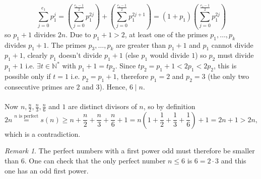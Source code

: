 \documentclass[11pt, a4paper, oneside]{article}
\theoremstyle{remark}
\newtheorem*{remark}{Remark}
\theoremstyle{lemma}
\begin{document}
$$\sum_{j=0}^{e_1}p_{1}^{j}=\left(\sum_{j=0}^{\frac{e_1-1}{2}}p_1^{2j}\right)+\left(\sum_{j=0}^{\frac{e_1-1}{2}}p_1^{2j+1}\right)=(1+p_1)\left(\sum_{j=0}^{\frac{e_1-1}{2}}p_1^{2j}\right)$$
so \(p_{1} + 1\) divides \(2n\). Due to \(p_{1} + 1 > 2\), at least one of the primes \(p_{1}, \ldots, p_{k}\) divides \(p_{1} + 1\). The primes \(p_{3}, \ldots, p_{k}\) are greater than \(p_{1} + 1\) and \(p_{1}\) cannot divide \(p_{1} + 1\), clearly $p_{1}$ doesn't divide $p_{1}+1$ (else $p_{1}$ would divide $1$) so \(p_{2}\) must divide \(p_{1} + 1\) i.e. $\exists t\in\mathbb{N}^{*}$ with $p_{1}+1=tp_{2}$. Since \(tp_{2}=p_{1} + 1 < 2p_{1}<2p_{2}\), this is possible only if $t=1$ i.e. \(p_{2} = p_{1} + 1\), therefore \(p_{1} = 2\) and \(p_{2} = 3\) (the only two consecutive primes are $2$ and $3$). Hence, \(6 \mid n\).
\\\\
Now \(n, \frac{n}{2}, \frac{n}{3}, \frac{n}{6}\) and \(1\) are distinct divisors of \(n\), so by definition
\[
2n\overset{n\text{ is perfect}}{=}s(n) \geq n + \frac{n}{2} + \frac{n}{3} + \frac{n}{6} + 1 = n\left(1+\frac{1}{2} + \frac{1}{3} + \frac{1}{6}\right)+1= 2n + 1 > 2n,
\]
which is a contradiction.
\begin{remark}
The perfect numbers with a first power odd must therefore be smaller than $6$. One can check that the only perfect number $n\leq 6$ is $6=2\cdot 3$ and this one has an odd first power.
\end{remark}
\end{document}
